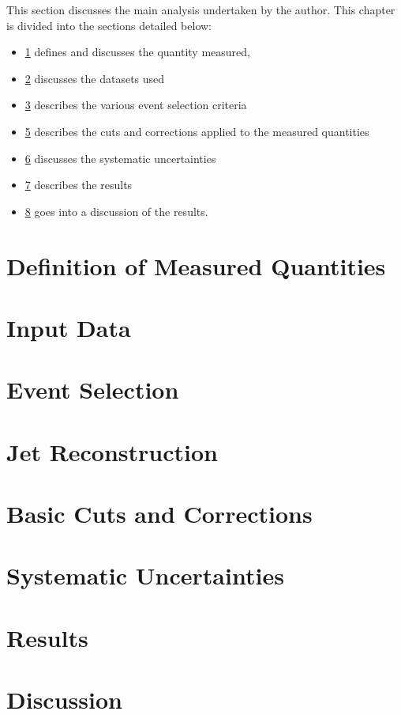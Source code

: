 
This section discusses the main analysis undertaken by the author. This chapter is divided into the sections detailed below:

\begin{itemize}
\item \ref{sec:trkjet_corr_measurement} defines and discusses the quantity measured,
\item \ref{sec:used_data} discusses the datasets used
\item \ref{sec:event_selection} describes the various event selection criteria
\item \ref{sec:cuts_corrections} describes the cuts and corrections applied to the measured quantities
\item \ref{sec:systematic} discusses the systematic uncertainties
\item \ref{sec:results} describes the results
\item \ref{sec:discussion} goes into a discussion of the results. 
\end{itemize}

\section{Definition of Measured Quantities}
\label{sec:trkjet_corr_measurement}


\section{Input Data}
\label{sec:used_data}


\section{Event Selection }
\label{sec:event_selection}


\section{Jet Reconstruction}
\label{sec:reconstruction}


\section{Basic Cuts and Corrections}
\label{sec:cuts_corrections}


\section{Systematic Uncertainties}
\label{sec:systematic}


\section{Results}
\label{sec:results}


\section{Discussion}
\label{sec:discussion}


%
